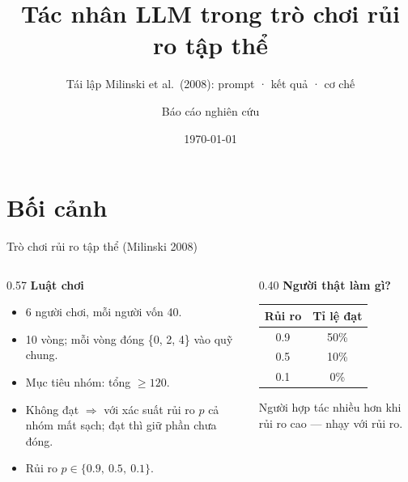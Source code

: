 \documentclass[aspectratio=169,11pt]{beamer}
\title{Tác nhân LLM trong trò chơi rủi ro tập thể}
\subtitle{Tái lập Milinski et al.\ (2008): prompt · kết quả · cơ chế}
\date{\today}
\author{Báo cáo nghiên cứu}
\begin{document}
\maketitle

\section{Bối cảnh}

\begin{frame}{Trò chơi rủi ro tập thể (Milinski 2008)}
  \begin{columns}[T]
    \begin{column}{0.57\textwidth}
      \textbf{Luật chơi}
      \begin{itemize}
        \item 6 người chơi, mỗi người vốn 40.
        \item 10 vòng; mỗi vòng đóng \{0, 2, 4\} vào quỹ chung.
        \item \alert{Mục tiêu nhóm}: tổng $\geq 120$.
        \item Không đạt $\Rightarrow$ với xác suất rủi ro $p$ cả nhóm \alert{mất sạch}; đạt thì giữ phần chưa đóng.
        \item Rủi ro $p \in \{0.9,\ 0.5,\ 0.1\}$.
      \end{itemize}
    \end{column}
    \begin{column}{0.40\textwidth}
      \textbf{Người thật làm gì?}
      \smallskip
      \begin{center}
      \begin{tabular}{cc}
        \toprule
        Rủi ro & Tỉ lệ đạt \\
        \midrule
        0.9 & 50\% \\
        0.5 & 10\% \\
        0.1 & \phantom{0}0\% \\
        \bottomrule
      \end{tabular}
      \end{center}
      \smallskip
      {\footnotesize Người \alert{hợp tác nhiều hơn khi rủi ro cao} — nhạy với rủi ro.}
    \end{column}
  \end{columns}
\end{frame}
\end{document}
